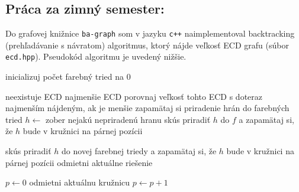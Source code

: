 \documentclass[11pt]{article}
\begin{document}
\subsection*{Práca za zimný semester:}

Do grafovej knižnice \texttt{ba-graph} som v jazyku \texttt{c++} naimplementoval backtracking (prehľadávanie 
s návratom) algoritmus, ktorý nájde veľkosť ECD grafu (súbor \texttt{ecd.hpp}). Pseudokód algoritmu je uvedený nižšie.
\begin{algorithmic}[1]
   
        \State inicializuj počet farebný tried na 0
        \State {}

            \State \Return neexistuje ECD
        \Else
            \State \Return najmenšie ECD
        \EndIf
    \EndFunction
    \State
            \State porovnaj veľkosť tohto ECD s doteraz najmenším nájdeným, ak je menšie zapamätaj si priradenie hrán do farebných tried
            \State \Return
        \Else
            \State $h \gets$ zober nejakú nepriradenú hranu \label{line:vyber}
                \State skús priradiť $h$ do $f$ a zapamätaj si, že $h$ bude v kružnici na párnej pozícii
                \State {}
            \EndFor

            \State skús priradiť $h$ do novej farebnej triedy a zapamätaj si, že $h$ bude v kružnici na párnej pozícii
            \State odmietni aktuálne riešenie
            \State \Return
            \EndIf
            \State {}
        \EndIf

    \EndFunction
    \State
        \State $p \gets 0$ 
            \State odmietni aktuálnu kružnicu 
            \State \Return
            \Else
            \State $p \gets p+1$
            \EndIf
        \EndIf
        \EndFor
        

\end{algorithmic}
\end{document}
